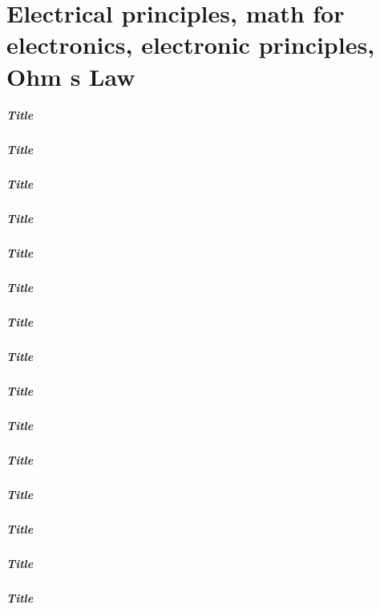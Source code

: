 \documentclass[10pt]{beamer}
\begin{document}
\part{Electrical principles, math for electronics, electronic principles, Ohm s Law}

\begin{frame}
\frametitle{Title}

\end{frame}

\begin{frame}
\frametitle{Title}

\end{frame}

\begin{frame}
\frametitle{Title}

\end{frame}

\begin{frame}
\frametitle{Title}

\end{frame}

\begin{frame}
\frametitle{Title}

\end{frame}

\begin{frame}
\frametitle{Title}

\end{frame}

\begin{frame}
\frametitle{Title}

\end{frame}

\begin{frame}
\frametitle{Title}

\end{frame}

\begin{frame}
\frametitle{Title}

\end{frame}

\begin{frame}
\frametitle{Title}

\end{frame}

\begin{frame}
\frametitle{Title}

\end{frame}

\begin{frame}
\frametitle{Title}

\end{frame}

\begin{frame}
\frametitle{Title}

\end{frame}

\begin{frame}
\frametitle{Title}

\end{frame}

\begin{frame}
\frametitle{Title}

\end{frame}

%
%
\end{document}
